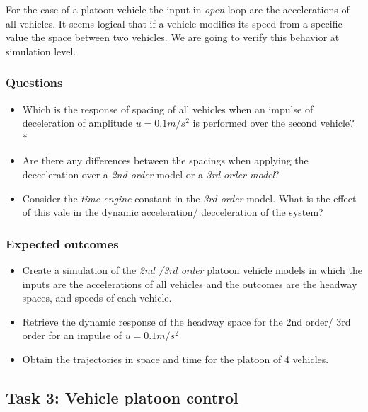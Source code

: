\documentclass[]{book}
\providecommand{\tightlist}{%
  \setlength{\itemsep}{0pt}\setlength{\parskip}{0pt}}
\theoremstyle{definition}
\theoremstyle{definition}
\theoremstyle{definition}
\theoremstyle{remark}
\begin{document}
For the case of a platoon vehicle the input in \emph{open} loop are the
accelerations of all vehicles. It seems logical that if a vehicle
modifies its speed from a specific value the space between two vehicles.
We are going to verify this behavior at simulation level.

\hypertarget{questions-5}{%
\subsubsection*{Questions}\label{questions-5}}

\begin{itemize}
\tightlist
\item
  Which is the response of spacing of all vehicles when an impulse of
  deceleration of amplitude \(u = 0.1m/s^2\) is performed over the
  second vehicle? *
\item
  Are there any differences between the spacings when applying the
  decceleration over a \emph{2nd order} model or a \emph{3rd order
  model}?
\item
  Consider the \emph{time engine} constant in the \emph{3rd order}
  model. What is the effect of this vale in the dynamic acceleration/
  decceleration of the system?
\end{itemize}

\hypertarget{expected-outcomes-5}{%
\subsubsection*{Expected outcomes}\label{expected-outcomes-5}}

\begin{itemize}
\tightlist
\item
  Create a simulation of the \emph{2nd /3rd order} platoon vehicle
  models in which the inputs are the accelerations of all vehicles and
  the outcomes are the headway spaces, and speeds of each vehicle.
\item
  Retrieve the dynamic response of the headway space for the 2nd order/
  3rd order for an impulse of \(u = 0.1m/s^2\)
\item
  Obtain the trajectories in space and time for the platoon of 4
  vehicles.
\end{itemize}

\hypertarget{task-3-vehicle-platoon-control}{%
\subsection*{Task 3: Vehicle platoon
control}\label{task-3-vehicle-platoon-control}}
\end{document}
